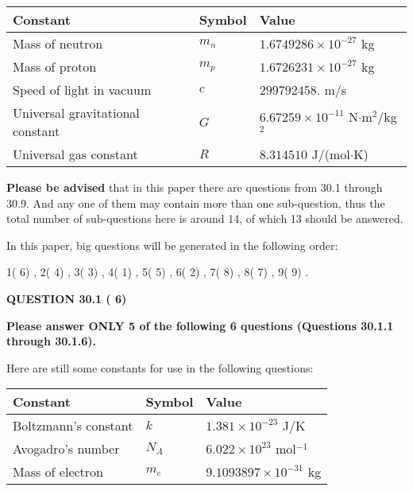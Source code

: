 \documentclass[12pt]{article}
\begin{document}
 
\noindent\begin{tabular}{|l|l|l|}
\hline
Constant & Symbol & Value \\
\hline
Mass of neutron &
$m_n$ &
 $ 1.6749286 \times 10^{-27} $
kg \\
\hline
Mass of proton &
$m_p$ &
 $ 1.6726231 \times 10^{-27} $
kg \\
\hline
Speed of light in vacuum &
$c$ &
 $ 299792458. $
m/s \\
\hline
Universal gravitational constant &
$G$ &
 $ 6.67259 \times 10^{-11} $
N$\cdot $m$^2$/kg$^2$ \\
\hline
Universal gas constant &
$R$ &
 $ 8.314510 $
J/(mol$\cdot $K) \\
\hline
\end{tabular}
 
 
{\textbf{\large{Please be advised}}} that in this paper there are questions from
30.1 through
30.9.
And any one of them may contain more than one sub-question, thus the total number
of sub-questions here is around 14, of which
13 should be answered.
 
\vspace{0.3in}
 
 
   
   
   
\vspace{0.2in}
   
In this paper, big questions will be generated in the following order: 
   
   
            1(          6)
 ,
            2(          4)
 ,
            3(          3)
 ,
            4(          1)
 ,
            5(          5)
 ,
            6(          2)
 ,
            7(          8)
 ,
            8(          7)
 ,
            9(          9)
 .
  
\vspace{0.2in}
  
{\textbf{\Large{QUESTION
30.1 
 (          6)
}}}
  
  
 
{\textbf{\Large{Please answer ONLY
5 of the following
6 questions (Questions
30.1.1 through
30.1.6). }}}
 
Here are still some constants for use in the following questions:
 
 
\noindent\begin{tabular}{|l|l|l|}
\hline
Constant & Symbol & Value \\
\hline
 
Boltzmann's constant &
$k$ &
 $ 1.381 \times 10^{-23} $
J/K \\
\hline
 
Avogadro's number &
$N_A$ &
 $ 6.022 \times 10^{23} $
mol$^{-1}$ \\
\hline
 
Mass of electron &
$m_e$ &
 $ 9.1093897 \times 10^{-31} $
kg \\
\hline
 
\end{tabular}
 
\end{document}
